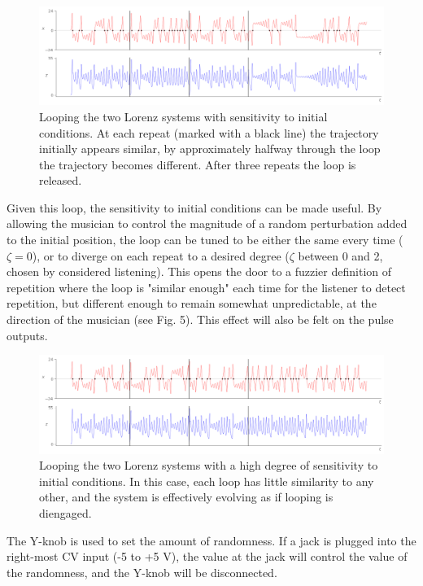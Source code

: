 \documentclass{tufte-handout}
\begin{document}
\begin{figure}[h]
  \includegraphics[width=\linewidth]{dependent_loop.png}%
  \caption{Looping the two Lorenz systems with sensitivity to initial conditions. At each repeat (marked with a black line) the trajectory initially appears similar, by approximately halfway through the loop the trajectory becomes different. After three repeats the loop is released.}%
  \label{fig:dependent_loop}%
\end{figure}

Given this loop, the sensitivity to initial conditions can be made useful. By allowing the musician to control the magnitude of a random perturbation added to the initial position, the loop can be tuned to be either the same every time ($\zeta=0$), or to diverge on each repeat to a desired degree ($\zeta$ between 0 and 2, chosen by considered listening). This opens the door to a fuzzier definition of repetition where the loop is "similar enough" each time for the listener to detect repetition, but different enough to remain somewhat unpredictable, at the direction of the musician (see Fig. 5). This effect will also be felt on the pulse outputs. 

\begin{figure}[h]
  \includegraphics[width=\linewidth]{very_dependent_loop.png}%
  \caption{Looping the two Lorenz systems with a high degree of sensitivity to initial conditions. In this case, each loop has little similarity to any other, and the system is effectively evolving as if looping is diengaged.}%
  \label{fig:very_dependent_loop}%
\end{figure}

The Y-knob is used to set the amount of randomness. If a jack is plugged into the right-most CV input (-5 to +5 V), the value at the jack will control the value of the randomness, and the Y-knob will be disconnected.
\end{document}
